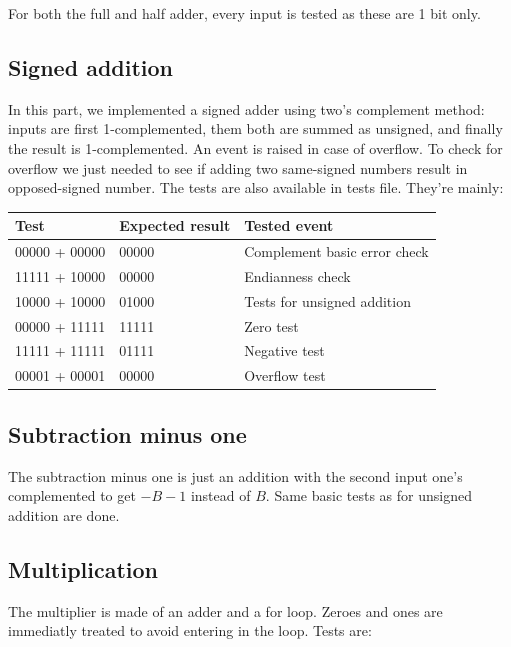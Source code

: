 \documentclass[a4paper]{report}
\begin{document}
	For both the full and half adder, every input is tested as these are 1 bit only. \\

\subsection{Signed addition}

	In this part, we implemented a signed adder using two's complement method: inputs are first 1-complemented, them both are summed as unsigned, and finally the result is 1-complemented. An event is raised in case of overflow. To check for overflow we just needed to see if adding two same-signed numbers result in opposed-signed number. The tests are also available in tests file. They're mainly:

\begin{center}
	\begin{tabular}{|l|l|l|}
		\hline
		Test & Expected result & Tested event \\
		\hline \hline
		00000 + 00000 & 00000 & Complement basic error check \\
		11111 + 10000 & 00000 & Endianness check \\
		10000 + 10000 & 01000 & Tests for unsigned addition \\
		00000 + 11111 & 11111 & Zero test \\
		11111 + 11111 & 01111 & Negative test \\
		00001 + 00001 & 00000 & Overflow test \\
		\hline
	\end{tabular}
\end{center}

\subsection{Subtraction minus one}

	The subtraction minus one is just an addition with the second input one's complemented to get $-B-1$ instead of $B$. Same basic tests as for unsigned addition are done.

\subsection{Multiplication}

	The multiplier is made of an adder and a for loop. Zeroes and ones are immediatly treated to avoid entering in the loop. Tests are:
\end{document}
